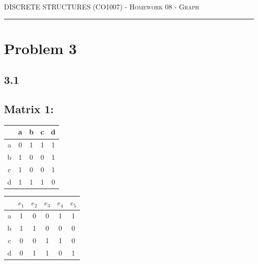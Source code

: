 \documentclass{article}
\begin{document}
{\scshape } \hfill {\scshape DISCRETE STRUCTURES (CO1007) - Homework 08 - Graph} \hfill {\scshape }
 
\smallskip

\hrule

\bigskip

\bigskip 
\section*{Problem 3}

\subsection*{3.1}
\subsection*{Matrix 1:}
\begin{table}[h]
\begin{tabular}{c|c c c c}

  & a & b & c & d \\ \hline
a & 0 & 1 & 1 & 1 \\
b & 1 & 0 & 0 & 1 \\
c & 1 & 0 & 0 & 1 \\
d & 1 & 1 & 1 & 0 \\
\end{tabular}
\hspace{6em}
\begin{tabular}{c|c c c c c}

  & $e_{1}$ & $e_{2}$ & $e_{3}$ & $e_{4}$ & $e_{5}$ \\ \hline
a & 1 & 0 & 0 & 1 & 1 \\
b & 1 & 1 & 0 & 0 & 0 \\
c & 0 & 0 & 1 & 1 & 0 \\
d & 0 & 1 & 1 & 0 & 1 \\
\end{tabular}
\end{table}
\end{document}
